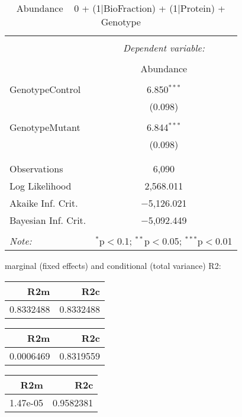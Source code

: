\documentclass[11pt]{report}
\begin{document}
\begin{table}[!htbp] \centering 
  \caption{Abundance ~ 0 + (1|BioFraction) + (1|Protein) + Genotype} 
  \label{} 
\begin{tabular}{@{\extracolsep{5pt}}lc} 
\\[-1.8ex]\hline 
\hline \\[-1.8ex] 
 & \multicolumn{1}{c}{\textit{Dependent variable:}} \\ 
\cline{2-2} 
\\[-1.8ex] & Abundance \\ 
\hline \\[-1.8ex] 
 GenotypeControl & 6.850$^{***}$ \\ 
  & (0.098) \\ 
  & \\ 
 GenotypeMutant & 6.844$^{***}$ \\ 
  & (0.098) \\ 
  & \\ 
\hline \\[-1.8ex] 
Observations & 6,090 \\ 
Log Likelihood & 2,568.011 \\ 
Akaike Inf. Crit. & $-$5,126.021 \\ 
Bayesian Inf. Crit. & $-$5,092.449 \\ 
\hline 
\hline \\[-1.8ex] 
\textit{Note:}  & \multicolumn{1}{r}{$^{*}$p$<$0.1; $^{**}$p$<$0.05; $^{***}$p$<$0.01} \\ 
\end{tabular} 
\end{table} 
marginal (fixed effects) and conditional (total variance) R2:

\begin{tabular}{r|r}
\hline
R2m & R2c\\
\hline
0.8332488 & 0.8332488\\
\hline
\end{tabular}

\begin{tabular}{r|r}
\hline
R2m & R2c\\
\hline
0.0006469 & 0.8319559\\
\hline
\end{tabular}

\begin{tabular}{r|r}
\hline
R2m & R2c\\
\hline
1.47e-05 & 0.9582381\\
\hline
\end{tabular}
\end{document}
